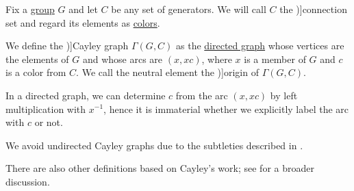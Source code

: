 \begin{definition}\label{def:cayley_graph}\mimprovised
  Fix a \hyperref[def:group]{group} \( G \) and let \( C \) be any set of generators. We will call \( C \) the \term[en=connection set (\cite[def. 7.3.1]{Knauer2019AlgebraicGraphTheory})]{connection set} and regard its elements as \hyperref[def:set_coloring]{colors}.

  We define the \term[en=Cayley graph (\cite[def. 2.1.3]{HadelerMüller2017CellularAutomata})]{Cayley graph} \( \Gamma(G, C) \) as the \hyperref[def:directed_graph]{directed graph} whose vertices are the elements of \( G \) and whose arcs are \( (x, xc) \), where \( x \) is a member of \( G \) and \( c \) is a color from \( C \). We call the neutral element the \term[en=origin (\cite[def. 2.1.3]{HadelerMüller2017CellularAutomata})]{origin} of \( \Gamma(G, C) \).
\end{definition}
\begin{comments}
  \item In a directed graph, we can determine \( c \) from the arc \( (x, xc) \) by left multiplication with \( x^{-1} \), hence it is immaterial whether we explicitly label the arc with \( c \) or not.

  \item We avoid undirected Cayley graphs due to the subtleties described in .

  \item There are also other definitions based on Cayley's work; see  for a broader discussion.
\end{comments}

